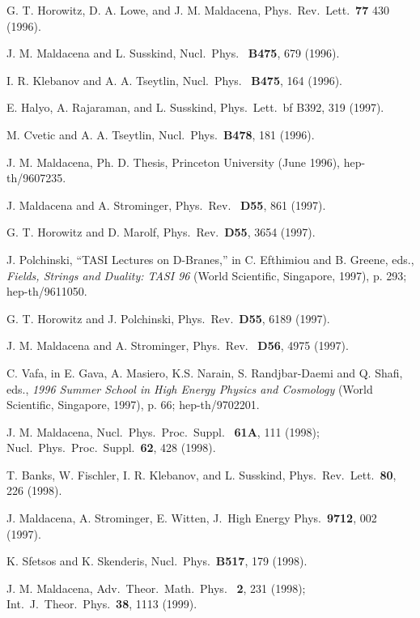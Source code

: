 \documentclass[12pt]{article} \usepackage{latexsym}
\begin{document}
\begin{thebibliography}{99}
 G. T. Horowitz, D. A. Lowe, and J. M. Maldacena, Phys.\
  Rev.\ Lett.\ {\bf 77} 430 (1996).

 J. M. Maldacena and L. Susskind, Nucl.\ Phys.\ {\bf
  B475}, 679 (1996).

 I. R. Klebanov and A. A. Tseytlin, Nucl.\ Phys.\ {\bf
  B475}, 164 (1996).

 E. Halyo, A. Rajaraman, and L. Susskind, Phys.\ Lett.\
  {bf B392}, 319 (1997).

 M. Cvetic and A. A. Tseytlin, Nucl.\ Phys.\ {\bf B478},
  181 (1996).

 J. M. Maldacena, Ph. D. Thesis, Princeton University
  (June 1996), hep-th/9607235.

 J. Maldacena and A. Strominger, Phys.\ Rev.\ {\bf
  D55}, 861 (1997).

 G. T. Horowitz and D. Marolf, Phys.\ Rev.\ {\bf D55},
  3654 (1997).

 J. Polchinski, ``TASI Lectures on D-Branes,'' in 
  C. Efthimiou and B. Greene, eds., \emph{Fields, Strings and Duality:
  TASI 96} (World Scientific, Singapore, 1997), p. 293;
  hep-th/9611050.

 G. T. Horowitz and J. Polchinski, Phys.\ Rev.\ {\bf D55},
  6189 (1997).

  J. M. Maldacena and A. Strominger, Phys.\ Rev.\ {\bf
  D56}, 4975 (1997).

 C. Vafa, in E. Gava, A. Masiero, K.S. Narain,
  S. Randjbar-Daemi and Q. Shafi, eds., \emph{1996 Summer School in High
  Energy Physics and Cosmology} (World Scientific, Singapore, 1997),
  p. 66; hep-th/9702201.

 J. M. Maldacena, Nucl.\ Phys.\ Proc.\ Suppl.\ {\bf
  61A}, 111 (1998); Nucl.\ Phys.\ Proc.\ Suppl.\ {\bf 62}, 428 (1998).

\bibitem{BFKS} T. Banks, W. Fischler, I. R. Klebanov, and L. Susskind,
  Phys.\ Rev.\ Lett.\ {\bf 80}, 226 (1998).

 J. Maldacena, A. Strominger, E. Witten, J.\ High Energy
  Phys.\ {\bf 9712}, 002 (1997).

 K. Sfetsos and K. Skenderis, Nucl.\ Phys.\ {\bf B517},
  179 (1998).

 J. M. Maldacena, Adv.\ Theor.\ Math.\ Phys.\ {\bf
  2}, 231 (1998); Int.\ J.\ Theor.\ Phys.\ {\bf 38}, 1113 (1999).


\end{thebibliography}
\end{document}
